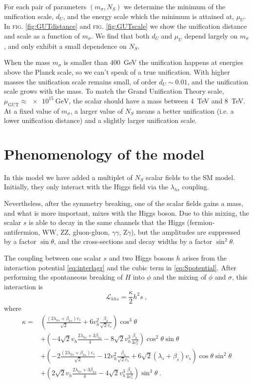 \documentclass[aps,prd,preprintnumbers,nofootinbibn,twocolumn]{revtex4}
\begin{document}
For each pair of parameters $(m_\sigma, N_S)$ we determine the minimum of the unification scale, $d_U$, and the energy scale which the minimum is attained at, $\mu_U$.  In \textsc{fig.} \ref{fig:GUTdistance} and \textsc{fig.} \ref{fig:GUTscale} we show the unification distance and scale as a function of $m_\sigma$. We find that both $d_U$ and $\mu_U$ depend largely on $m_\sigma$, and only exhibit a small dependence on $N_S$.


When the mass $m_\sigma$ is smaller than \SI{400}{\giga\electronvolt} the unification happens at energies above the Planck scale, so we can't speak of a true unification. With higher masses the unification scale remains small, of order $d_U \sim 0.01$, and the unification scale grows with the mass. To match the Grand Unification Theory scale, $\mu_{\mathrm{GUT}}\approx \SI{e15}{\giga\electronvolt}$, the scalar should have a mass between \SI{4}{\tera\electronvolt} and \SI{8}{\tera\electronvolt}. At a fixed value of $m_\sigma$, a larger value of $N_S$ means a better unification (i.e. a lower unification distance) and a slightly larger unification scale. 

\section{Phenomenology of the model}
In this model we have added a multiplet of $N_S$ scalar fields to the SM model. Initially, they only interact with the Higgs field via the $\lambda_{hs}$ coupling.

Nevertheless, after the symmetry breaking, one of the scalar fields gains a mass, and what is more important, mixes with the Higgs boson. Due to this mixing, the scalar $s$ is able to decay in the same channels that the Higgs (fermion-antifermion, WW, ZZ,  gluon-gluon, $\gamma\gamma$, Z$\gamma$), but the amplitudes are suppressed by a factor $\sin \theta$, and the cross-sections and decay widths by a factor $\sin^2\theta$. 

The coupling between one scalar $s$ and two Higgs bosons $h$ arises from the interaction potential \eqref{eq:interlagr} and the cubic term in \eqref{eq:Spotential}. After performing the spontaneous breaking of $H$ into $\phi$ and the mixing of $\phi$ and $\sigma$, this interaction is
\begin{equation}
\mathcal{L}_{hhs} = \frac{\kappa}{2} h^2 s\ ,
\end{equation}
where
{\scriptsize\begin{align}
\kappa =& \left(\frac{(2\lambda_{hs} + \beta_{hs})v_s}{\sqrt{2}} + 6 v_h^2\frac{\beta_h}{\sqrt{2} v_s} \right)\cos^3 \theta \nonumber\\
&+ \left(-4\sqrt{2}v_h \frac{2\lambda_{hs} + 3\beta_{hs}}{4} - 8\sqrt{2}v_h^3  \frac{\beta_h}{4 v_s^2} \right)\cos^2\theta \sin \theta \nonumber\\
&+ \left(-2\frac{(2\lambda_{hs} + \beta_{hs})v_s}{\sqrt{2}} -12 v_h^2\frac{\beta_h}{\sqrt{2} v_s} +6\sqrt{2}(\lambda_s+\beta_s) v_s \right)\cos\theta \sin^2\theta \nonumber\\
&+\left(2\sqrt{2}v_h \frac{2\lambda_{hs} + 3\beta_{hs}}{4} -4\sqrt{2}v_h^3 \frac{\beta_h}{4 v_s^2} \right)\sin^3\theta\ .
\end{align}}
\end{document}
